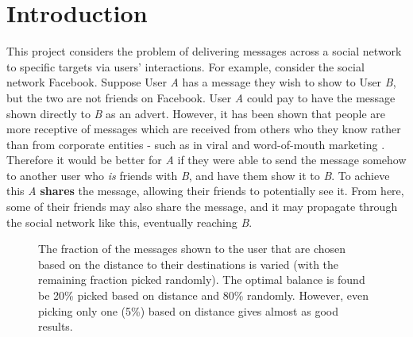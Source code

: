 \documentclass[bsc,frontabs,twoside,singlespacing,parskip,deptreport]{infthesis}     %
\begin{document}
\tableofcontents


\chapter{Introduction}
\setcounter{page}{1}

This project considers the problem of delivering messages across a social network to specific targets via users' interactions. For example, consider the social network Facebook. Suppose User \textit{A} has a message they wish to show to User \textit{B}, but the two are not friends on Facebook. User \textit{A} could pay to have the message shown directly to \textit{B} as an advert. However, it has been shown that people are more receptive of messages which are received from others who they know rather than from corporate entities - such as in viral and word-of-mouth marketing \cite{viralmarketing, wordofmouth}. Therefore it would be better for \textit{A} if they were able to send the message somehow to another user who \textit{is} friends with \textit{B}, and have them show it to \textit{B}. To achieve this \textit{A} \textbf{shares} the message, allowing their friends to potentially see it. From here, some of their friends may also share the message, and it may propagate through the social network like this, eventually reaching \textit{B}.

\begin{figure}
\centering
{}
\caption{The fraction of the messages shown to the user that are chosen based on the distance to their destinations is varied (with the remaining fraction picked randomly). The optimal balance is found be 20\% picked based on distance and 80\% randomly. However, even picking only one (5\%) based on distance gives almost as good results.}
\label{fig:distance_priority_fraction_intro}
\end{figure}
\end{document}
